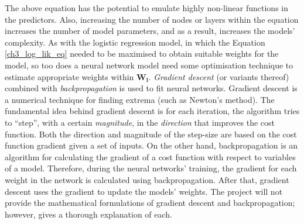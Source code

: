 The above equation has the potential to emulate highly non-linear functions in the predictors. Also, increasing the number of nodes or layers within the equation increases the number of model parameters, and as a result, increases the models' complexity. As with the logistic regression model, in which the Equation \ref{ch3_log_lik_eq} needed to be maximised to obtain suitable weights for the model, so too does a neural network model need some optimisation technique to estimate appropriate weights within $\boldsymbol{W_l}$. \textit{Gradient descent} (or variants thereof) combined with \textit{backpropagation} is used to fit neural networks. Gradient descent is a numerical technique for finding extrema (such as Newton's method). The fundamental idea behind gradient descent is for each iteration, the algorithm tries to ``step'', with a certain \textit{magnitude}, in the \textit{direction} that improves the cost function. Both the direction and magnitude of the step-size are based on the cost function gradient given a set of inputs. On the other hand, backpropagation is an algorithm for calculating the gradient of a cost function with respect to variables of a model. Therefore, during the neural networks' training, the gradient for each weight in the network is calculated using backpropagation. After that, gradient descent uses the gradient to update the models' weights. The project will not provide the mathematical formulations of gradient descent and backpropagation; however, \citet*{nielsen2015neural} gives a thorough explanation of each.

